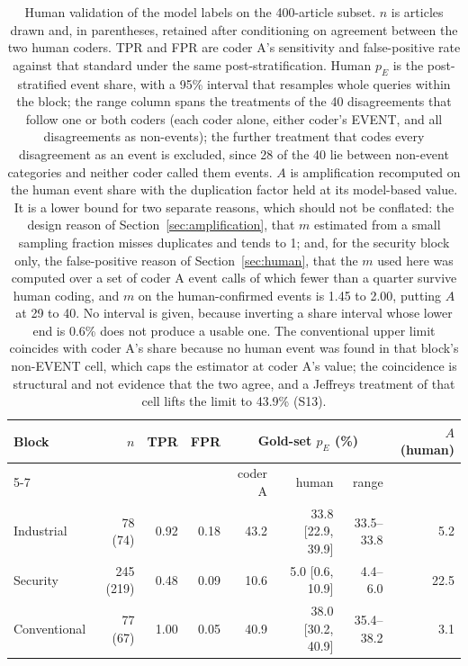 \documentclass[1p,times]{elsarticle}
\begin{document}
\begin{table}[!t]
\centering\small
\caption{Human validation of the model labels on the 400-article subset. $n$ is articles drawn and, in parentheses, retained after conditioning on agreement between the two human coders. TPR and FPR are coder A's sensitivity and false-positive rate against that standard under the same post-stratification. Human $p_E$ is the post-stratified event share, with a 95\% interval that resamples whole queries within the block; the range column spans the treatments of the 40 disagreements that follow one or both coders (each coder alone, either coder's EVENT, and all disagreements as non-events); the further treatment that codes every disagreement as an event is excluded, since 28 of the 40 lie between non-event categories and neither coder called them events. $A$ is amplification recomputed on the human event share with the duplication factor held at its model-based value. It is a lower bound for two separate reasons, which should not be conflated: the design reason of Section~\ref{sec:amplification}, that $m$ estimated from a small sampling fraction misses duplicates and tends to 1; and, for the security block only, the false-positive reason of Section~\ref{sec:human}, that the $m$ used here was computed over a set of coder A event calls of which fewer than a quarter survive human coding, and $m$ on the human-confirmed events is 1.45 to 2.00, putting $A$ at 29 to 40. No interval is given, because inverting a share interval whose lower end is 0.6\% does not produce a usable one. The conventional upper limit coincides with coder A's share because no human event was found in that block's non-EVENT cell, which caps the estimator at coder A's value; the coincidence is structural and not evidence that the two agree, and a Jeffreys treatment of that cell lifts the limit to 43.9\% (S13).}
\label{tab:human}
\footnotesize\setlength{\tabcolsep}{3pt}
\begin{tabular*}{\textwidth}{@{\extracolsep{\fill}}lrrrrrrr@{}}
\toprule
Block & $n$ & TPR & FPR & \multicolumn{3}{c}{Gold-set $p_E$ (\%)} & $A$ (human) \\
\cmidrule(lr){5-7}
 & & & & coder A & human & range & \\
\midrule
Industrial & 78 (74) & 0.92 & 0.18 & 43.2 & 33.8 [22.9, 39.9] & 33.5--33.8 & 5.2 \\
Security & 245 (219) & 0.48 & 0.09 & 10.6 & 5.0 [0.6, 10.9] & 4.4--6.0 & 22.5 \\
Conventional & 77 (67) & 1.00 & 0.05 & 40.9 & 38.0 [30.2, 40.9] & 35.4--38.2 & 3.1 \\
\bottomrule
\end{tabular*}
\end{table}
\end{document}
